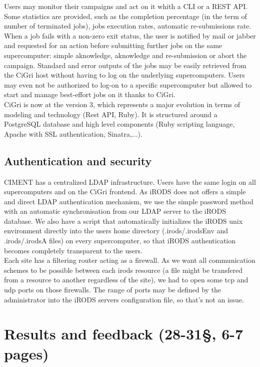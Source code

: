 \documentclass[a4paper, 10pt]{article}
\begin{document}
\begin{multicols}{2}

Users may monitor their campaigns and act on it whith a CLI or a REST API. Some statistics are provided, such as the completion percentage (in the term of number of terminated jobs), jobs execution rates, automatic re-submissions rate. When a job fails with a non-zero exit status, the user is notified by mail or jabber and requested for an action before submitting further jobs on the same supercomputer: simple aknowledge, aknowledge and re-submission or abort the campaign. Standard and error outputs of the jobs may be easily retrieved from the CiGri host without having to log on the underlying supercomputers. Users may even not be authorized to log-on to a specific supercomputer but allowed to start and manage best-effort jobs on it thanks to CiGri.
\\
CiGri is now at the version 3, which represents a major evolution in terms of modeling and technology (Rest API, Ruby). It is structured around a PostgreSQL database and high level components (Ruby scripting language, Apache with SSL authentication, Sinatra,...).

\newpage

\subsection{Authentication and security}

CIMENT has a centralized LDAP infrastructure. Users have the same login on all supercomputers and on the CiGri frontend. As iRODS does not offers a simple and direct LDAP authentication mechanism, we use the simple password method with an automatic synchronisation from our LDAP server to the iRODS database. We also have a script that automatically initializes the iRODS unix environment directly into the users home directory (.irods/.irodsEnv and .irods/.irodsA files) on every supercomputer, so that iRODS authentication becomes completely transparent to the users.
\\
Each site has a filtering router acting as a firewall. As we want all communication schemes to be possible between each irods resource (a file might be transfered from a resource to another regardless of the site), we had to open some tcp and udp ports on those firewalls. The range of ports may be defined by the administrator into the iRODS servers configuration file, so that's not an issue.

\newpage

\section{Results and feedback (28-31\S, 6-7 pages)}


\end{multicols}
\end{document}
